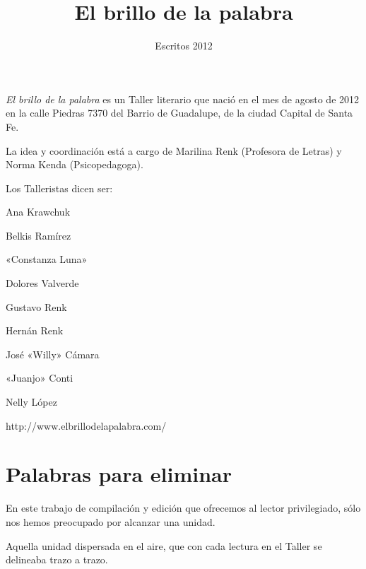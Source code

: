 \documentclass[11pt,twoside,openright,a5paper]{book}
\title{El brillo de la palabra}
\author{Escritos 2012}
\date{}
\begin{document}
\pagestyle{plain}

\maketitle

\emph{El brillo de la palabra} es un Taller literario que nació en el mes de agosto de 2012 en la calle Piedras 7370 del Barrio de Guadalupe, de la ciudad Capital de Santa Fe.

La idea y coordinación está a cargo de Marilina Renk (Profesora de Letras) y Norma Kenda (Psicopedagoga).

\vspace{1cm}

Los Talleristas dicen ser:

\vspace{0.5cm}

Ana Krawchuk

Belkis  Ramírez

«Constanza Luna»

Dolores Valverde

Gustavo Renk

Hernán Renk

José «Willy» Cámara

«Juanjo» Conti

Nelly López

\vspace{1.5cm}


\begin{center}
http://www.elbrillodelapalabra.com/
\end{center}

\setlength{\parskip}{0pt plus 1pt}


\tableofcontents

\chapter*{Palabras para eliminar}

En este trabajo de compilación y edición que ofrecemos al lector privilegiado, sólo nos hemos preocupado por alcanzar una unidad. 

Aquella unidad dispersada en el aire, que con cada lectura en el Taller se delineaba trazo  a trazo. 
\end{document}
